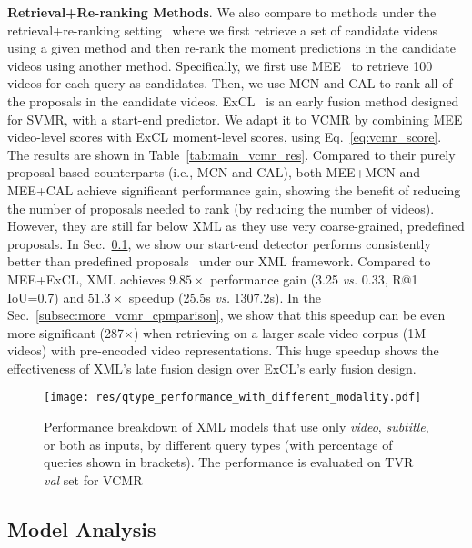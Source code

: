 \documentclass[runningheads]{llncs}
\begin{document}
\kern1mm
\noindent\textbf{Retrieval+Re-ranking Methods}.
We also compare to methods under the retrieval+re-ranking setting~\cite{escorcia2019temporal} where we first retrieve a set of candidate videos using a given method and then re-rank the moment predictions in the candidate videos using another method. 
Specifically, we first use MEE~\cite{miech2018learning} to retrieve 100 videos for each query as candidates. 
Then, we use MCN and CAL to rank all of the proposals in the candidate videos. ExCL~\cite{ghosh2019excl} is an early fusion method designed for SVMR, with a start-end predictor. 
We adapt it to VCMR by combining MEE video-level scores with ExCL moment-level scores, using Eq.~\ref{eq:vcmr_score}. 
The results are shown in Table~\ref{tab:main_vcmr_res}. 
Compared to their purely proposal based counterparts (i.e., MCN and CAL), both MEE+MCN and MEE+CAL achieve significant performance gain, showing the benefit of reducing the number of proposals needed to rank (by reducing the number of videos). 
However, they are still far below XML as they use very coarse-grained, predefined proposals.
In Sec.~\ref{subsec:model_analysis}, we show our start-end detector performs consistently better than predefined proposals~\cite{escorcia2019temporal,zhao2017temporal} under our XML framework.
Compared to MEE+ExCL, XML achieves $9.85\times$ performance gain (3.25 \textit{vs.} 0.33, R@1 IoU=0.7) and $51.3\times$ speedup (25.5s \textit{vs.} 1307.2s). 
In the Sec.~\ref{subsec:more_vcmr_cpmparison}, we show that this speedup can be even more significant (287$\times$) when retrieving on a larger scale video corpus (1M videos) with pre-encoded video representations.
This huge speedup shows the effectiveness of XML's late fusion design over ExCL's early fusion design.

\begin{figure*}[!t]
  \centering
  \texttt{[image: res/qtype\_performance\_with\_different\_modality.pdf]}
  \caption{Performance breakdown of XML models that use only \textit{video}, \textit{subtitle}, or both as inputs, by different query types (with percentage of queries shown in brackets). The performance is evaluated on TVR \textit{val} set for VCMR}
  \label{fig:qtype_performance}
\end{figure*}


\subsection{Model Analysis}\label{subsec:model_analysis}
\end{document}
